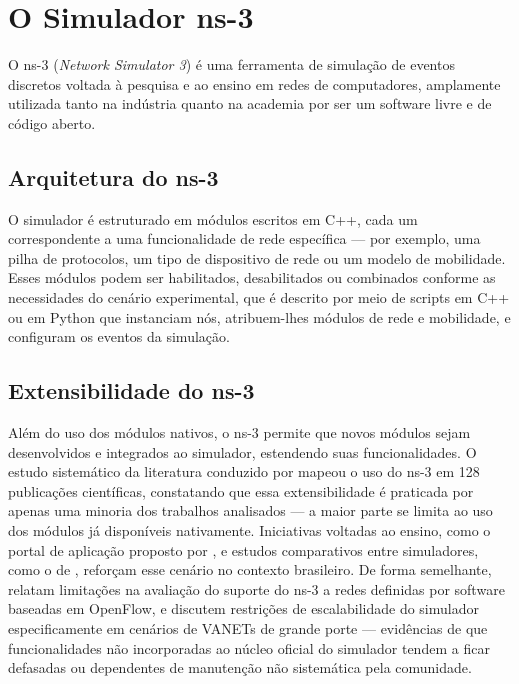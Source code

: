\section{O Simulador ns-3}
\label{sec:ns3}

O ns-3 (\textit{Network Simulator 3}) é uma ferramenta de simulação de eventos discretos
voltada à pesquisa e ao ensino em redes de computadores, amplamente utilizada tanto na
indústria quanto na academia por ser um software livre e de código aberto.

\subsection{Arquitetura do ns-3}
\label{sec:arquitetura-ns3}

O simulador é estruturado em módulos escritos em C++, cada um correspondente a uma
funcionalidade de rede específica — por exemplo, uma pilha de protocolos, um tipo de
dispositivo de rede ou um modelo de mobilidade. Esses módulos podem ser habilitados,
desabilitados ou combinados conforme as necessidades do cenário experimental, que é descrito
por meio de scripts em C++ ou em Python que instanciam nós, atribuem-lhes módulos de rede e
mobilidade, e configuram os eventos da simulação.

\subsection{Extensibilidade do ns-3}
\label{sec:extensibilidade-ns3}

Além do uso dos módulos nativos, o ns-3 permite que novos módulos sejam desenvolvidos e
integrados ao simulador, estendendo suas funcionalidades. O estudo sistemático da literatura
conduzido por  mapeou o uso do ns-3 em 128 publicações
científicas, constatando que essa extensibilidade é praticada por apenas uma minoria dos
trabalhos analisados — a maior parte se limita ao uso dos módulos já disponíveis nativamente.
Iniciativas voltadas ao ensino, como o portal de aplicação proposto por
, e estudos comparativos entre simuladores, como o de
, reforçam esse cenário no contexto brasileiro. De forma
semelhante,  relatam limitações na avaliação do suporte do
ns-3 a redes definidas por software baseadas em OpenFlow, e 
discutem restrições de escalabilidade do simulador especificamente em cenários de VANETs de
grande porte — evidências de que funcionalidades não incorporadas ao núcleo oficial do
simulador tendem a ficar defasadas ou dependentes de manutenção não sistemática pela
comunidade.

